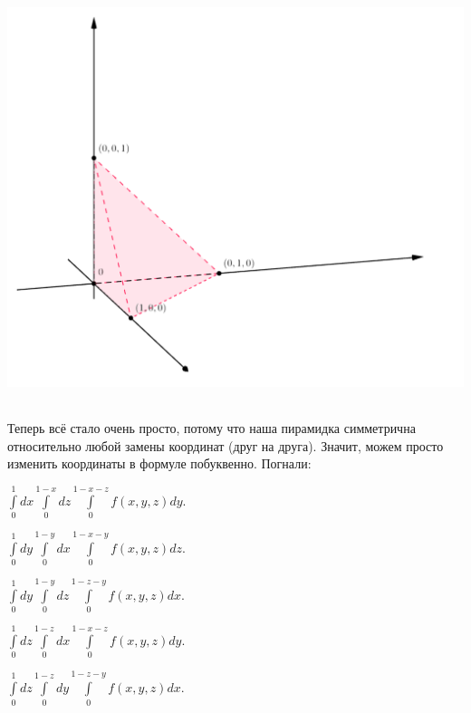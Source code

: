 \documentclass[a4paper, fleqn]{article}
\begin{document}
    \includegraphics[width=14cm, height=12cm]{task 17.png}
    
    Теперь всё стало очень просто, потому что наша пирамидка симметрична относительно любой замены координат (друг на друга). Значит, можем просто изменить координаты в формуле побуквенно. Погнали:
    
        
    $\int\limits_{0}^{1} dx \int\limits_{0}^{1 - x} dz \int\limits_{0}^{1 - x - z} f(x, y, z) dy.$
    
        
    $\int\limits_{0}^{1} dy \int\limits_{0}^{1 - y} dx \int\limits_{0}^{1 - x - y} f(x, y, z) dz.$
    
    $\int\limits_{0}^{1} dy \int\limits_{0}^{1 - y} dz \int\limits_{0}^{1 - z - y} f(x, y, z) dx.$
        
    $\int\limits_{0}^{1} dz \int\limits_{0}^{1 - z} dx \int\limits_{0}^{1 - x - z} f(x, y, z) dy.$
    
    $\int\limits_{0}^{1} dz \int\limits_{0}^{1 - z} dy \int\limits_{0}^{1 - z - y} f(x, y, z) dx.$
    
\end{document}
